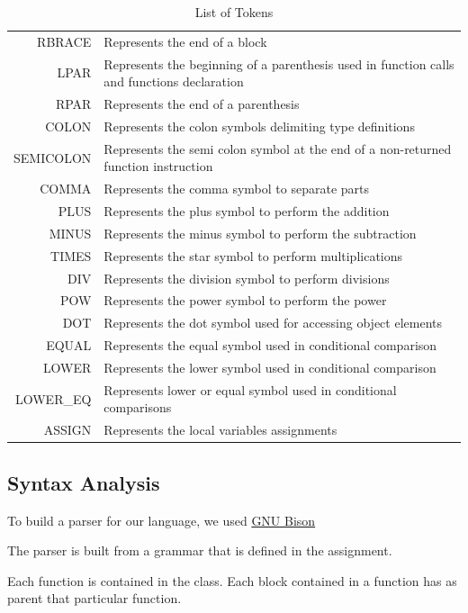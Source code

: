 \documentclass[a4paper,11pt]{article}
\begin{document}
\begin{table}[hp]
\begin{tabular}{|r|p{10cm}|}
      RBRACE& Represents the end of a block\\
      LPAR & Represents the beginning of a parenthesis used in function calls and functions declaration\\
      RPAR & Represents the end of a parenthesis\\
      COLON & Represents the colon symbols delimiting type definitions\\
      SEMICOLON & Represents the semi colon symbol at the end of a non-returned function instruction \\
      COMMA & Represents the comma symbol to separate parts \\
      PLUS & Represents the plus symbol to perform the addition\\
      MINUS & Represents the minus symbol to perform the subtraction\\
      TIMES & Represents the star symbol to perform multiplications\\
      DIV & Represents the division symbol to perform divisions\\
      POW & Represents the power symbol to perform the power\\
      DOT & Represents the dot symbol used for accessing object elements\\
      EQUAL & Represents the equal symbol used in conditional comparison\\
      LOWER & Represents the lower symbol used in conditional comparison\\
      LOWER\_EQ & Represents lower or equal symbol used in conditional comparisons\\
      ASSIGN & Represents the local variables assignments\\
      \hline
      \end{tabular}
      \caption{List of Tokens\label{tab:listToken}}
    \end{table}

\subsection{Syntax Analysis}
  \label{sec:syntax}
  To build a parser for our language, we used \href{https://www.gnu.org/software/bison/}{GNU Bison} 

  The parser is built from a grammar that is defined in the assignment.

  Each function is contained in the class. Each block contained in a function has as parent that particular function.
\end{document}
